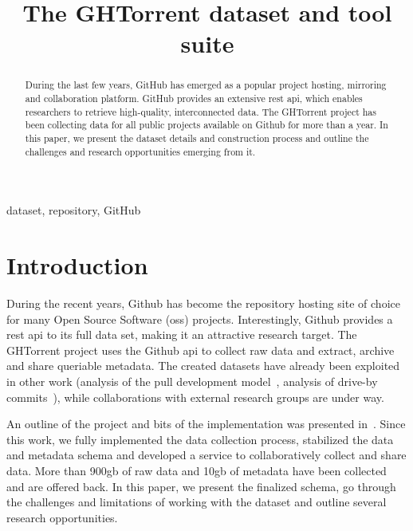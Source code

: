 \documentclass[conference]{IEEEtran}
\begin{document}
\title{The GHTorrent dataset and tool suite}

\author{ 
}

\maketitle

\begin{abstract} 
  
  During the last few years, GitHub has emerged as a popular project hosting,
  mirroring and collaboration platform. GitHub provides an extensive {\sc rest
  api}, which enables researchers to retrieve high-quality, interconnected data.
  The GHTorrent project has been collecting data for all public projects
  available on Github for more than a year. In this paper, we present the dataset
  details and construction process and outline the challenges and research
  opportunities emerging from it.

\end{abstract}

\begin{IEEEkeywords}
dataset, repository, GitHub
\end{IEEEkeywords}

\section{Introduction} During the recent years, Github has become the repository
hosting site of choice for many Open Source Software ({\sc oss}) projects.
Interestingly, Github provides a {\sc rest api} to its full data set, making it
an attractive research target. The GHTorrent project uses the Github {\sc api}
to collect raw data and extract, archive and share queriable metadata. The
created datasets have already been exploited in other work (analysis of the pull
development model~\cite{GPD13}, analysis of drive-by commits~\cite{TMAGS13}),
while collaborations with external research groups are under way. 

An outline of the project and bits of the implementation was presented in~\cite{GS12}. Since this work, we fully implemented the data collection process, stabilized the data and metadata
schema and developed a service to collaboratively collect and share data. More
than 900{\sc gb} of raw data and 10{\sc gb} of metadata have been collected
and are offered back.
In this paper, we present the finalized schema, go through the challenges and limitations of working with the dataset and outline several research
opportunities.
\end{document}
